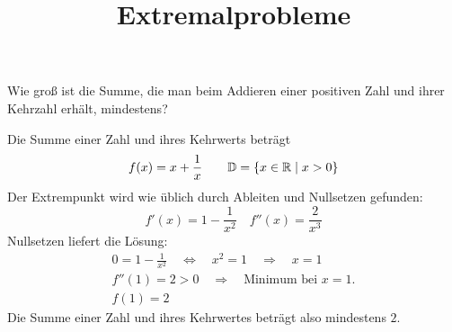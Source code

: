 \documentclass[auto-toc=false,babel=ngerman]{arbeitsblatt}
\title{Extremalprobleme}
\begin{document}
\maketitle



\begin{question}
  Wie groß ist die Summe, die man beim Addieren einer positiven Zahl und ihrer
  Kehrzahl erhält, mindestens?
\end{question}
\begin{solution}
  Die Summe einer Zahl und ihres Kehrwerts beträgt
  \begin{equation*}
    f(x) = x + \frac{1}{x} \qquad
    \mathbb{D} = \{x\in\mathbb{R}\mid x>0\}
  \end{equation*}
  Der Extrempunkt wird wie üblich durch Ableiten und Nullsetzen gefunden:
  \begin{equation*}
    f'(x)  = 1 - \frac{1}{x^2} \quad
    f''(x) = \frac{2}{x^3}
  \end{equation*}
  Nullsetzen liefert die Lösung:
  \begin{gather*}
    0 = 1 - \frac{1}{x^2}
    \quad \Leftrightarrow \quad
    x^2 = 1
    \quad \Rightarrow \quad x = 1 \\
    f''(1) = 2 > 0
    \quad \Rightarrow\quad
    \text{Minimum bei $x=1$.}\\
    f(1) = 2
  \end{gather*}
  Die Summe einer Zahl und ihres Kehrwertes beträgt also mindestens $2$.
\end{solution}
\end{document}
